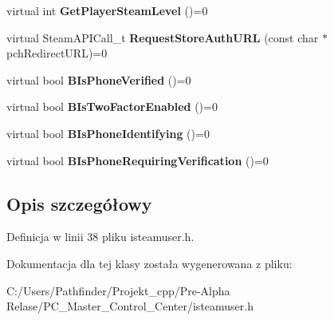 \begin{DoxyCompactItemize}
\mbox{\label{class_i_steam_user_ae4b393de52cb73b353f8edba83838864}} 
virtual int {\bfseries Get\+Player\+Steam\+Level} ()=0
\item 
\mbox{\label{class_i_steam_user_a8e4441998c39deed78c78f14a9ef29b7}} 
virtual Steam\+A\+P\+I\+Call\+\_\+t {\bfseries Request\+Store\+Auth\+U\+RL} (const char $\ast$pch\+Redirect\+U\+RL)=0
\item 
\mbox{\label{class_i_steam_user_a26902fbfbde0bbc7583dab7952556995}} 
virtual bool {\bfseries B\+Is\+Phone\+Verified} ()=0
\item 
\mbox{\label{class_i_steam_user_ab4415d7d98ebc44388c10e4834780f12}} 
virtual bool {\bfseries B\+Is\+Two\+Factor\+Enabled} ()=0
\item 
\mbox{\label{class_i_steam_user_ae77fdeee4d4445756ba4172621dfd327}} 
virtual bool {\bfseries B\+Is\+Phone\+Identifying} ()=0
\item 
\mbox{\label{class_i_steam_user_a8347e6bebb66cbd17e03b7c47df5db14}} 
virtual bool {\bfseries B\+Is\+Phone\+Requiring\+Verification} ()=0
\end{DoxyCompactItemize}


\subsection{Opis szczegółowy}


Definicja w linii 38 pliku isteamuser.\+h.



Dokumentacja dla tej klasy została wygenerowana z pliku\+:\begin{DoxyCompactItemize}
\item 
C\+:/\+Users/\+Pathfinder/\+Projekt\+\_\+cpp/\+Pre-\/\+Alpha Relase/\+P\+C\+\_\+\+Master\+\_\+\+Control\+\_\+\+Center/isteamuser.\+h\end{DoxyCompactItemize}

